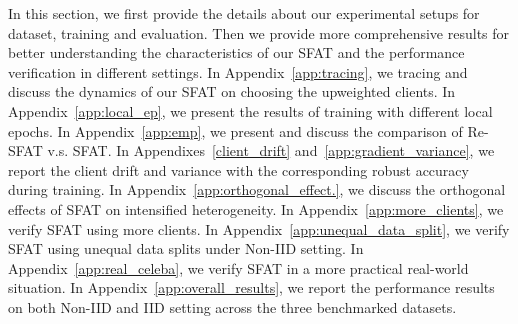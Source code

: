 \documentclass{article} %
\theoremstyle{plain}
\theoremstyle{definition}
\theoremstyle{remark}
\begin{document}
In this section, we first provide the details about our experimental setups for dataset, training and evaluation. Then we provide more comprehensive results for better understanding the characteristics of our SFAT and the performance verification in different settings. In Appendix~\ref{app:tracing}, we tracing and discuss the dynamics of our SFAT on choosing the upweighted clients. In Appendix~\ref{app:local_ep}, we present the results of training with different local epochs. In Appendix~\ref{app:emp}, we present and discuss the comparison of Re-SFAT v.s. SFAT. In Appendixes~\ref{client_drift} and~\ref{app:gradient_variance}, we report the client drift and variance with the corresponding robust accuracy during training. In Appendix~\ref{app:orthogonal_effect.}, we discuss the orthogonal effects of SFAT on intensified heterogeneity. In Appendix~\ref{app:more_clients}, we verify SFAT using more clients. In Appendix~\ref{app:unequal_data_split}, we verify SFAT using unequal data splits under Non-IID setting. In Appendix~\ref{app:real_celeba}, we verify SFAT in a more practical real-world situation. In Appendix~\ref{app:overall_results}, we report the performance results on both Non-IID and IID setting across the three benchmarked datasets.
\end{document}
